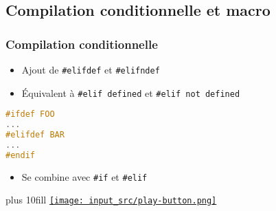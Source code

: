 \documentclass[C++.tex]{subfiles}
\begin{document}
\subsection*{Compilation conditionnelle et macro}
\begin{frame}[fragile]
	\frametitle{Compilation conditionnelle}
	\begin{itemize}
		\item Ajout de \lstinline|#elifdef| et \lstinline|#elifndef|
		\item Équivalent à \lstinline|#elif defined| et \lstinline|#elif not defined|
	\end{itemize}

	\begin{lstlisting}[language=C++]
#ifdef FOO
...
#elifdef BAR
...
#endif\end{lstlisting}

	\begin{itemize}
		\item Se combine avec \lstinline|#if| et \lstinline|#elif|
	\end{itemize}

	\vskip 10mm plus 10fill
	\hfill
	\href{https://godbolt.org/#g:!((g:!((g:!((h:codeEditor,i:(filename:'1',fontScale:14,fontUsePx:'0',j:1,lang:c%2B%2B,selection:(endColumn:3,endLineNumber:13,positionColumn:3,positionLineNumber:13,selectionStartColumn:3,selectionStartLineNumber:13,startColumn:3,startLineNumber:13),source:'%23include+%3Ciostream%3E%0A+%0A//%23define+FOO%0A//%23define+BAR%0A%0Aint+main()%0A%7B%0A%23ifdef+FOO%0A++std::cout+%3C%3C+%22FOO%5Cn%22%3B%0A%23elifdef+BAR%0A++std::cout+%3C%3C+%22BAR%5Cn%22%3B%0A%23else%0A++std::cout+%3C%3C+%22Autre%5Cn%22%3B%0A%23endif%0A%7D%0A'),l:'5',n:'0',o:'C%2B%2B+source+%231',t:'0')),k:50,l:'4',n:'0',o:'',s:0,t:'0'),(g:!((h:executor,i:(argsPanelShown:'1',compilationPanelShown:'0',compiler:g122,compilerName:'',compilerOutShown:'0',execArgs:'',execStdin:'',fontScale:14,fontUsePx:'0',j:1,lang:c%2B%2B,libs:!((name:boost,ver:'175')),options:'-std%3Dc%2B%2B23+-Wall+-Wextra+-pedantic',source:1,stdinPanelShown:'1',tree:'1',wrap:'0'),l:'5',n:'0',o:'Executor+x86-64+gcc+12.2+(C%2B%2B,+Editor+%231)',t:'0')),header:(),k:50,l:'4',n:'0',o:'',s:0,t:'0')),l:'2',n:'0',o:'',t:'0')),version:4}{\texttt{[image: input\_src/play-button.png]}}
\end{frame}
\end{document}
